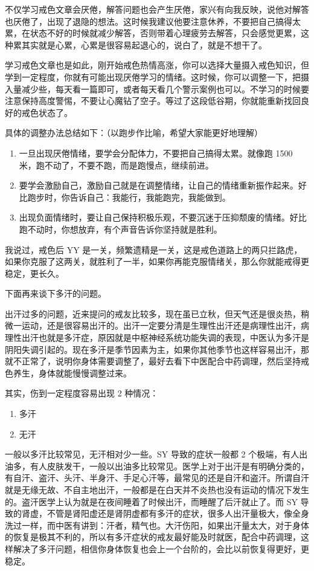 \documentclass{ctexart}
\begin{document}
不仅学习戒色文章会厌倦，解答问题也会产生厌倦，家兴有向我反映，说他对解答也厌倦了，出现了退隐的想法。这时候我建议他要注意休养，不要把自己搞得太累，在状态不好的时候就减少解答，否则带着心理疲劳去解答，只会感觉更累，这种累其实就是心累，心累是很容易起退心的，说白了，就是不想干了。

学习戒色文章也是如此，刚开始戒色热情高涨，你可以选择大量摄入戒色知识，但学到一定程度，你就有可能出现厌倦学习的情绪。这时候，你可以调整一下，把摄入量减少些，每天看一篇即可，或者每天看几个警示案例也可以。不学习的时候要注意保持高度警惕，不要让心魔钻了空子。等过了这段低谷期，你就能重新找回良好的戒色状态了。


具体的调整办法总结如下：（以跑步作比喻，希望大家能更好地理解）

\begin{enumerate}
    \item 一旦出现厌倦情绪，要学会分配体力，不要把自己搞得太累。就像跑 1500 米，跑不动了，不要不跑，而是跑慢点，继续前进。
    \item 要学会激励自己，激励自己就是在调整情绪，让自己的情绪重新振作起来。好比跑步时，你告诉自己：我能行，我能跑完，我能做到。
    \item 出现负面情绪时，要让自己保持积极乐观，不要沉迷于压抑颓废的情绪。好比跑不动时，你想放弃，有个声音告诉你坚持就是胜利。
\end{enumerate}

我说过，戒色后 YY 是一关，频繁遗精是一关，这是戒色道路上的两只拦路虎，如果你克服了这两关，就胜利了一半，如果你再能克服情绪关，那么你就能戒得更稳定，更长久。

下面再来谈下多汗的问题。

出汗过多的问题，近来提问的戒友比较多，现在虽已立秋，但天气还是很炎热，稍微一运动，还是很容易出汗的。出汗一定要分清是生理性出汗还是病理性出汗，病理性出汗也就是多汗症，原因就是中枢神经系统功能失调的表现，中医认为多汗是阴阳失调引起的。现在多汗是季节因素为主，如果你其他季节也这样容易出汗，那就不正常了，说明你身体需要调整了，最好去看下中医配合中药调理，然后坚持戒色养生，身体就能慢慢调整过来。

其实，伤到一定程度容易出现 2 种情况：

\begin{enumerate}
    \item 多汗
    \item 无汗
\end{enumerate}

一般以多汗比较常见，无汗相对少一些。SY 导致的症状一般都 2 个极端，有人出油多，有人皮肤发干，一般以出油多比较常见。医学上对于出汗是有明确分类的，有自汗、盗汗、头汗、半身汗、手足心汗等，最常见的还是自汗和盗汗。所谓自汗就是无缘无故、不自主地出汗，一般都是在白天并不炎热也没有运动的情况下发生的。盗汗医学上认为就是在夜间睡着了时候出汗，而睡醒了后汗就止了。而 SY 导致的肾虚，不管是肾阳虚还是肾阴虚都有多汗的症状，很多人出汗量极大，像全身洗过一样，而中医有讲到：汗者，精气也。大汗伤阳，如果出汗量太大，对于身体的恢复是极其不利的，所以有多汗症状的戒友最好能及时就医，配合中药调理，这样解决了多汗问题，相信你身体恢复也会上一个台阶的，会比以前恢复得更好，更稳定。
\end{document}
